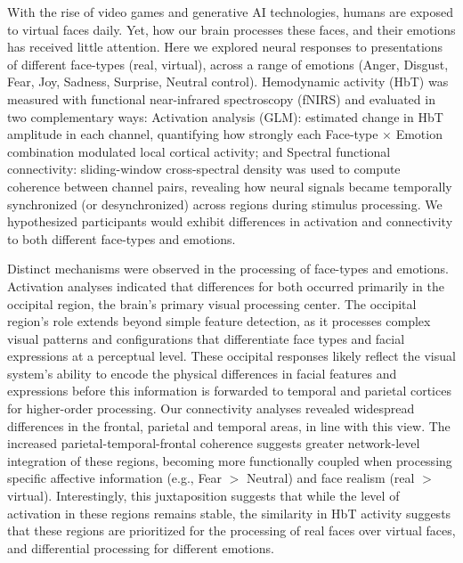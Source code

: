 With the rise of video games and generative AI technologies, humans are exposed to virtual faces daily. 
Yet, how our brain processes these faces, and their emotions has received little attention. 
Here we explored neural responses to presentations of different face-types (real, virtual), across a range of emotions (Anger, Disgust, Fear, Joy, Sadness, Surprise, Neutral control). 
Hemodynamic activity (HbT) was measured with functional near-infrared spectroscopy (fNIRS) and evaluated in two complementary ways: Activation analysis (GLM): estimated change in HbT amplitude in each channel, quantifying how strongly each Face-type \texorpdfstring{$\times$}{x} Emotion combination modulated local cortical activity; and Spectral functional connectivity: sliding-window cross-spectral density was used to compute coherence between channel pairs, revealing how neural signals became temporally synchronized (or desynchronized) across regions during stimulus processing. 
We hypothesized participants would exhibit differences in activation and connectivity to both different face-types and emotions. 

Distinct mechanisms were observed in the processing of face-types and emotions. 
Activation analyses indicated that differences for both occurred primarily in the occipital region, the brain's primary visual processing center. 
The occipital region's role extends beyond simple feature detection, as it processes complex visual patterns and configurations that differentiate face types and facial expressions at a perceptual level. 
These occipital responses likely reflect the visual system's ability to encode the physical differences in facial features and expressions before this information is forwarded to temporal and parietal cortices for higher-order processing. 
Our connectivity analyses revealed widespread differences in the frontal, parietal and temporal areas, in line with this view. 
The increased parietal-temporal-frontal coherence suggests greater network-level integration of these regions, becoming more functionally coupled when processing specific affective information (e.g., Fear $>$ Neutral) and face realism (real $>$ virtual).
Interestingly, this juxtaposition suggests that while the level of activation in these regions remains stable, the similarity in HbT activity suggests that these regions are prioritized for the processing of real faces over virtual faces, and differential processing for different emotions.

